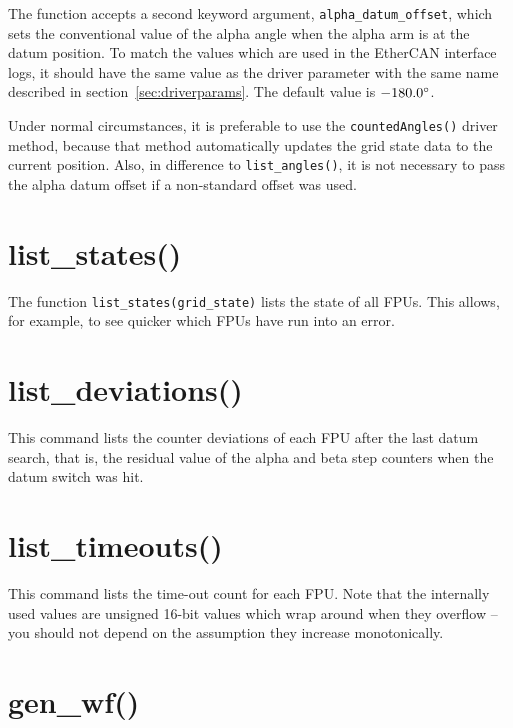 \documentclass[fontsize=12,a4paper]{scrreprt}
\begin{document}
 The function accepts a second keyword
argument, \texttt{alpha\_datum\_offset}, which sets the conventional
value of the alpha angle when the alpha arm is at the datum position.
To match the values which are used in the EtherCAN interface logs, it should have
the same value as the driver parameter with the same name described in
section~\ref{sec:driverparams}. The default value is $-180.0\degree$.

Under normal circumstances, it is preferable to use the
\texttt{countedAngles()} driver method, because that method
automatically updates the grid state data to the current position.
Also, in difference to \texttt{list\_angles()}, it is not necessary
  to pass the alpha datum offset if a non-standard offset was used.

\section{list\_states()}
\label{sec:liststates}

The function \texttt{list\_states(grid\_state)} lists the state of all
FPUs. This allows, for example, to see quicker which FPUs have run into an error.

\section{list\_deviations()}
This command lists the counter deviations of each FPU after the last
datum search, that is, the residual value of the alpha and beta step
counters when the datum switch was hit.

\section{list\_timeouts()}
 This command lists the time-out count for
each FPU. Note that the internally used values are unsigned 16-bit
values which wrap around when they overflow -- you should not depend
on the assumption they increase monotonically.


\section{gen\_wf()}
\label{sec:genwf}

\end{document}
